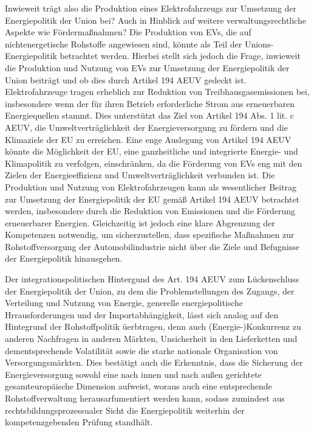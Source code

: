 \documentclass[12pt,a4paper,oneside]{book} %
\begin{document}
	Inwieweit trägt also die Produktion eines Elektrofahrzeugs zur Umsetzung der Energiepolitik der Union bei? Auch in Hinblick auf weitere verwaltungsrechtliche Aspekte wie Fördermaßnahmen?
	Die Produktion von EVs, die auf nichtenergetische Rohstoffe angewiesen sind, könnte als Teil der Unions-Energiepolitik betrachtet werden. Hierbei stellt sich jedoch die Frage, inwieweit die Produktion und Nutzung von EVs zur Umsetzung der Energiepolitik der Union beiträgt und ob dies durch Artikel 194 AEUV gedeckt ist. Elektrofahrzeuge tragen erheblich zur Reduktion von Treibhausgasemissionen bei, insbesondere wenn der für ihren Betrieb erforderliche Strom aus erneuerbaren Energiequellen stammt. Dies unterstützt das Ziel von Artikel 194 Abs. 1 lit. c AEUV, die Umweltverträglichkeit der Energieversorgung zu fördern und die Klimaziele der EU zu erreichen. Eine enge Auslegung von Artikel 194 AEUV könnte die Möglichkeit der EU, eine ganzheitliche und integrierte Energie- und Klimapolitik zu verfolgen, einschränken, da die Förderung von EVs eng mit den Zielen der Energieeffizienz und Umweltverträglichkeit verbunden ist.
	Die Produktion und Nutzung von Elektrofahrzeugen kann als wesentlicher Beitrag zur Umsetzung der Energiepolitik der EU gemäß Artikel 194 AEUV betrachtet werden, insbesondere durch die Reduktion von Emissionen und die Förderung erneuerbarer Energien. Gleichzeitig ist jedoch eine klare Abgrenzung der Kompetenzen notwendig, um sicherzustellen, dass spezifische Maßnahmen zur Rohstoffversorgung der Automobilindustrie nicht über die Ziele und Befugnisse der Energiepolitik hinausgehen.
	
	Der integrationspolitischen Hintergund des Art. 194 AEUV zum Lückenschluss der Energiepolitik der Union, zu dem die Problemstellungen des Zugangs, der Verteilung und Nutzung von Energie, generelle energiepolitische Hrrausforderungen und der Importabhängigkeit,\autocite{Nettesheim in Grabitz/Hilf, AEUV Art. 194, Rn. 10} lässt sich analog auf den Hintegrund der Rohstoffpolitik üerbtragen, denn auch (Energie-)Konkurrenz zu anderen Nachfragen in anderen Märkten, Unsicherheit in den Lieferketten und dementsprechende Volatilität sowie die starke nationale Organisation von Versorgungsmärkten.\autocite{Rn. 10} Dies bestätigt auch die Erkenntnis, dass die Sicherung der Energieversorgung sowohl eine nach innen und nach außen gerichtete gesamteuropäische Dimension aufweist, woraus auch eine entsprechende Rohstoffverwaltung herausarfumentiert werden kann, sodass zumindest aus rechtsbildungsprozessualer Sicht die Energiepolitik weiterhin der kompetenzgebenden Prüfung standhält.
	
\end{document}
